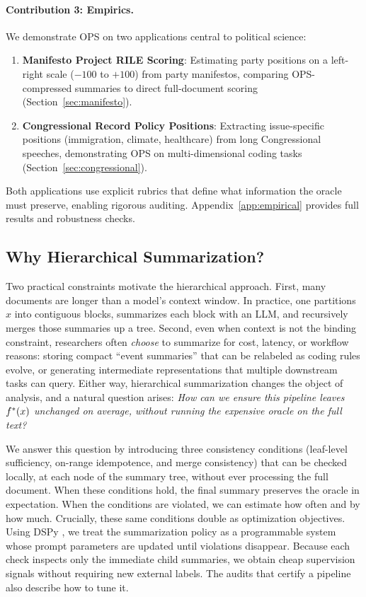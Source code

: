 \paragraph{Contribution 3: Empirics.} We demonstrate OPS on two applications central to political science:
\begin{enumerate}[nosep]
    \item \textbf{Manifesto Project RILE Scoring}: Estimating party positions on a left-right scale ($-100$ to $+100$) from party manifestos, comparing OPS-compressed summaries to direct full-document scoring (Section~\ref{sec:manifesto}).
    \item \textbf{Congressional Record Policy Positions}: Extracting issue-specific positions (immigration, climate, healthcare) from long Congressional speeches, demonstrating OPS on multi-dimensional coding tasks (Section~\ref{sec:congressional}).
\end{enumerate}
Both applications use explicit rubrics that define what information the oracle must preserve, enabling rigorous auditing. Appendix~\ref{app:empirical} provides full results and robustness checks.

\subsection{Why Hierarchical Summarization?}

Two practical constraints motivate the hierarchical approach. First, many documents are longer than a model's context window. In practice, one partitions $x$ into contiguous blocks, summarizes each block with an LLM, and recursively merges those summaries up a tree. Second, even when context is not the binding constraint, researchers often \emph{choose} to summarize for cost, latency, or workflow reasons: storing compact ``event summaries'' that can be relabeled as coding rules evolve, or generating intermediate representations that multiple downstream tasks can query. Either way, hierarchical summarization changes the object of analysis, and a natural question arises: \emph{How can we ensure this pipeline leaves $f^{\ast}(x)$ unchanged on average, without running the expensive oracle on the full text?}

We answer this question by introducing three consistency conditions (leaf-level sufficiency, on-range idempotence, and merge consistency) that can be checked locally, at each node of the summary tree, without ever processing the full document. When these conditions hold, the final summary preserves the oracle in expectation. When the conditions are violated, we can estimate how often and by how much. Crucially, these same conditions double as optimization objectives. Using DSPy \citep{khattab2024dspy}, we treat the summarization policy as a programmable system whose prompt parameters are updated until violations disappear. Because each check inspects only the immediate child summaries, we obtain cheap supervision signals without requiring new external labels. The audits that certify a pipeline also describe how to tune it.

